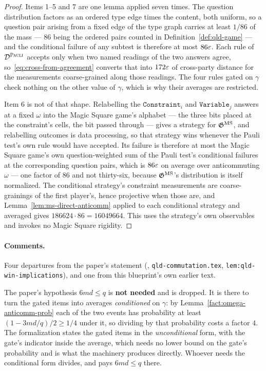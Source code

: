 \begin{proof}
\leanok
{}
Items 1--5 and 7 are one lemma applied seven times. The question distribution factors as an
ordered type edge times the content, both uniform, so a question pair arising from a fixed edge
of the type graph carries at least $1/86$ of the mass --- $86$ being the ordered pairs counted in
Definition~\ref{def:qld-game} --- and the conditional failure of any subtest is therefore at
most $86\varepsilon$. Each rule of $\mathcal{D}^{\textsc{Pauli}}$ accepts only when two named readings of the two
answers agree, so~\eqref{eq:cross-from-agreement} converts that into $172\varepsilon$ of cross-party
distance for the measurements coarse-grained along those readings. The four rules gated on
$\gamma$ check nothing on the other value of $\gamma$, which is why their averages are
restricted.

Item 6 is not of that shape. Relabelling the $\mathtt{Constraint}_i$ and $\mathtt{Variable}_j$
answers at a fixed $\omega$ into the Magic Square game's alphabet --- the three bits placed at
the constraint's cells, the bit passed through --- gives a strategy for $\mathfrak{G}^{\mathrm{MS}}$, and
relabelling outcomes is data processing, so that strategy wins whenever the Pauli test's own rule
would have accepted. Its failure is therefore at most the Magic Square game's own
question-weighted sum of the Pauli test's conditional failures at the corresponding question
pairs, which is $86\varepsilon$ on average over anticommuting $\omega$ --- one factor of $86$ and not
thirty-six, because $\mathfrak{G}^{\mathrm{MS}}$'s distribution is itself normalized. The conditional strategy's
constraint measurements are coarse-grainings of the first player's, hence projective when those
are, and Lemma~\ref{lem:ms-direct-anticomm} applied to each conditional strategy and averaged gives
$186624 \cdot 86 = 16049664$. This uses the strategy's own observables and invokes no Magic Square
rigidity.
\end{proof}

\paragraph{Comments.} Four departures from the paper's statement
(\cite{AuditSync26}, \texttt{qld-commutation.tex}, \texttt{lem:qld-win-implications}), and one
from this blueprint's own earlier text.

The paper's hypothesis $6md \leq q$ is \textbf{not needed} and is dropped. It is there to turn
the gated items into averages \emph{conditioned} on $\gamma$: by
Lemma~\ref{fact:omega-anticomm-prob} each of the two events has probability at least
$(1 - 3md/q)/2 \geq 1/4$ under it, so dividing by that probability costs a factor $4$. The
formalization states the gated items in the \emph{unconditional} form, with the gate's indicator
inside the average, which needs no lower bound on the gate's probability and is what the
machinery produces directly. Whoever needs the conditional form divides, and pays $6md \leq q$
there.

